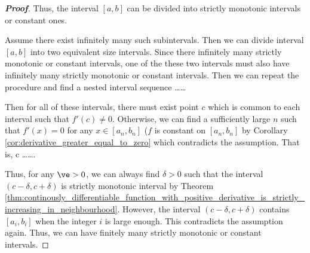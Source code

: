 \begin{proof}[\bf Proof]
Thus, the interval $[a,b]$ can be divided into strictly monotonic intervals or constant ones.

Assume there exist infinitely many such subintervals. Then we can divide interval $[a,b]$ into two equivalent size intervals. Since there infinitely many strictly monotonic or constant intervals, one of the these two intervals must also have infinitely many strictly monotonic or constant intervals. Then we can repeat the procedure and find a nested interval sequence
\be
[a,b] \supseteq [a_1,b_1] \supseteq \dots \supseteq [a_n,b_n] \supseteq \dots
\ee

Then for all of these intervals, there must exist point $c$ which is common to each interval such that $f'(c)\neq 0$. Otherwise, we can find a sufficiently large $n$ such that $f'(x)=0$ for any $x\in [a_n,b_n]$ ($f$ is constant on $[a_n,b_n]$ by Corollary \ref{cor:derivative_greater_equal_to_zero} which contradicts the assumption. That is,
\be
c \in \dots \subseteq [a_n,b_n] \subseteq  \dots \subseteq [a_1,b_1] \subseteq [a,b].
\ee

Thus, for any $\ve>0$, we can always find $\delta >0$ such that the interval $(c-\delta,c+\delta)$ is strictly monotonic interval by Theorem \ref{thm:continously_differentiable_function_with_positive_derivative_is_strictly_increasing_in_neighbourhood}. However, the interval $(c-\delta,c+\delta)$ contains $[a_i,b_i]$ when the integer $i$ is large enough. This contradicts the assumption again. Thus, we can have finitely many strictly monotonic or constant intervals.%
\end{proof}





